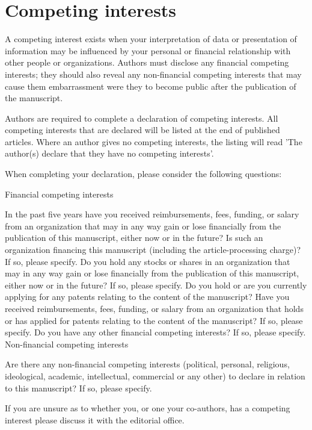 \section*{Competing interests}
A competing interest exists when your interpretation of data or presentation of information may be influenced by your personal or financial relationship with other people or organizations. Authors must disclose any financial competing interests; they should also reveal any non-financial competing interests that may cause them embarrassment were they to become public after the publication of the manuscript.

Authors are required to complete a declaration of competing interests. All competing interests that are declared will be listed at the end of published articles. Where an author gives no competing interests, the listing will read 'The author(s) declare that they have no competing interests'.

When completing your declaration, please consider the following questions:

Financial competing interests

In the past five years have you received reimbursements, fees, funding, or salary from an organization that may in any way gain or lose financially from the publication of this manuscript, either now or in the future? Is such an organization financing this manuscript (including the article-processing charge)? If so, please specify.
Do you hold any stocks or shares in an organization that may in any way gain or lose financially from the publication of this manuscript, either now or in the future? If so, please specify.
Do you hold or are you currently applying for any patents relating to the content of the manuscript? Have you received reimbursements, fees, funding, or salary from an organization that holds or has applied for patents relating to the content of the manuscript? If so, please specify.
Do you have any other financial competing interests? If so, please specify.
Non-financial competing interests

Are there any non-financial competing interests (political, personal, religious, ideological, academic, intellectual, commercial or any other) to declare in relation to this manuscript? If so, please specify.

If you are unsure as to whether you, or one your co-authors, has a competing interest please discuss it with the editorial office.